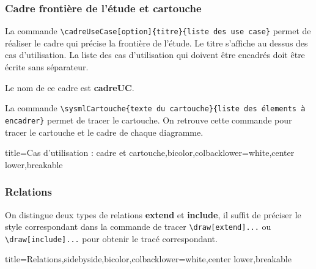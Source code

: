 \documentclass[a4paper,11pt]{article}                      %
\begin{document}
\subsubsection{Cadre frontière de l'étude et cartouche}

La commande 
\verb!\cadreUseCase[option]{titre}{liste des use case}!  permet de réaliser le cadre qui précise la frontière de l'étude. Le titre s'affiche  au dessus des cas d'utilisation. La liste des cas d'utilisation qui doivent être encadrés  doit être écrite sans séparateur.

Le nom  de ce cadre est \textbf{cadreUC}.

La commande  \verb!\sysmlCartouche{texte du cartouche}{liste des élements à encadrer}!  permet de tracer le cartouche.  On retrouve cette commande  pour tracer le cartouche et le cadre de chaque diagramme.

\begin{tcblisting}{title={Cas d'utilisation : cadre et cartouche},bicolor,colbacklower=white,center lower,breakable}
\end{tcblisting}


\subsubsection{Relations}

On distingue deux types de relations  \textbf{extend}  et \textbf{include}, il suffit de préciser le style correspondant dans la commande de tracer \verb!\draw[extend]...!  ou   \verb!\draw[include]...!  pour obtenir le tracé correspondant.

\begin{tcblisting}{title={Relations},sidebyside,bicolor,colbacklower=white,center lower,breakable}
\end{tcblisting}
\end{document}
